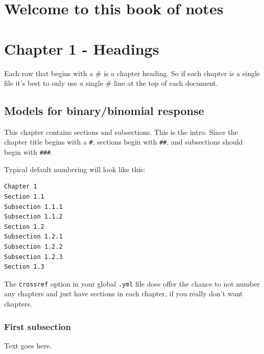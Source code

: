 \documentclass[
  a4paper,
  DIV=11,
  numbers=noendperiod,
  oneside]{scrreport}
\author{}
\date{}
\renewcommand*\contentsname{Table of contents}
\newcommand\contentsname{Table of contents}
\begin{document}
\renewcommand*\contentsname{Table of contents}
{
\hypersetup{linkcolor=}
\setcounter{tocdepth}{2}
\tableofcontents
}


\chapter*{Welcome to this book of
notes}\label{welcome-to-this-book-of-notes}



\chapter{Chapter 1 - Headings}\label{sec-headings}

Each row that begins with a \# is a chapter heading. So if each chapter
is a single file it's best to only use a single \# line at the top of
each document.

\section{Models for binary/binomial response}\label{sec-binary-response}

This chapter contains sections and subsections. This is the intro. Since
the chapter title begins with a \texttt{\#}, sections begin with
\texttt{\#\#}, and subsections should begin with \texttt{\#\#\#}.

Typical default numbering will look like this:

\begin{verbatim}
Chapter 1
Section 1.1
Subsection 1.1.1
Subsection 1.1.2
Section 1.2
Subsection 1.2.1
Subsection 1.2.2
Subsection 1.2.3
Section 1.3
\end{verbatim}

The \texttt{crossref} option in your global \texttt{.yml} file does
offer the chance to not number any chapters and just have sections in
each chapter, if you really don't want chapters.

\subsection{First subsection}\label{first-subsection}

Text goes here.
\end{document}
